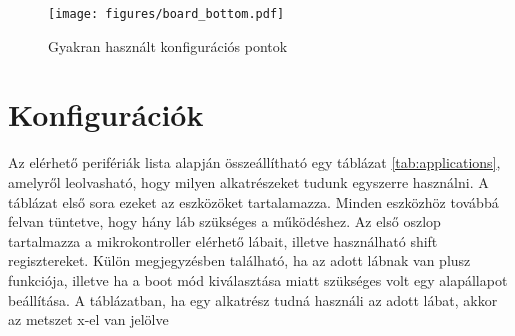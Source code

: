 \begin{figure}[th!]
    \centering
    \texttt{[image: figures/board\_bottom.pdf]}
    \caption{Gyakran használt konfigurációs pontok}
    \label{fig:nodered_ui}
\end{figure}


\section{Konfigurációk}
Az elérhető perifériák lista alapján összeállítható egy táblázat \ref{tab:applications}, amelyről leolvasható, hogy milyen alkatrészeket tudunk egyszerre használni. A táblázat első sora ezeket az eszközöket tartalamazza. Minden eszközhöz továbbá felvan tüntetve, hogy hány láb szükséges a működéshez. Az első oszlop tartalmazza a mikrokontroller elérhető lábait, illetve használható shift regisztereket. Külön megjegyzésben található, ha az adott lábnak van plusz funkciója, illetve ha a boot mód kiválasztása miatt szükséges volt egy alapállapot beállítása. A táblázatban, ha egy alkatrész tudná használi az adott lábat, akkor az metszet x-el van jelölve


